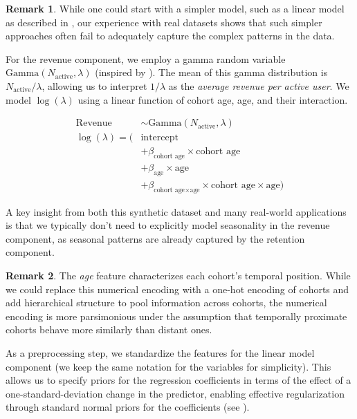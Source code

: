 \documentclass[11pt]{amsart}
\theoremstyle{definition}
\newtheorem{remark}{Remark}
\begin{document}
\begin{remark}
    While one could start with a simpler model, such as a linear model as described in \cite{orduz_revenue_retention},
    our experience with real datasets shows that such simpler approaches often fail to adequately capture the complex
    patterns in the data.
\end{remark}

For the revenue component, we employ a gamma random variable $\text{Gamma}(N_{\text{active}}, \lambda)$ (inspired by
\cite{stucchio2015bayesian}). The mean of this gamma distribution is $N_{\text{active}} / \lambda$, allowing us to interpret
$1 / \lambda$ as the {\em average revenue per active user}. We model $\log(\lambda)$ using a linear function of cohort age,
age, and their interaction.

\begin{align*}
    \text{Revenue}    & \sim \text{Gamma}(N_{\text{active}}, \lambda)                                             \\
    \log(\lambda) = ( & \text{intercept}                                                                          \\
                      & + \beta_{\text{cohort age}} \times \text{cohort age}                                      \\
                      & + \beta_{\text{age}} \times \text{age}                                                    \\
                      & + \beta_{\text{cohort age} \times \text{age}} \times \text{cohort age} \times \text{age})
\end{align*}

A key insight from both this synthetic dataset and many real-world applications is that we typically don't need to explicitly
model seasonality in the revenue component, as seasonal patterns are already captured by the retention component.

\begin{remark}
    The {\em age} feature characterizes each cohort's temporal position. While we could replace this numerical encoding with
    a one-hot encoding of cohorts and add hierarchical structure to pool information across cohorts, the numerical encoding
    is more parsimonious under the assumption that temporally proximate cohorts behave more similarly than distant ones.
\end{remark}

As a preprocessing step, we standardize the features for the linear model component (we keep the same notation for the
variables for simplicity). This allows us to specify priors for the regression coefficients in terms of the effect of a
one-standard-deviation change in the predictor, enabling effective regularization through standard normal priors for the
coefficients (see \cite{orduz_retention_bart}). \\
\end{document}
